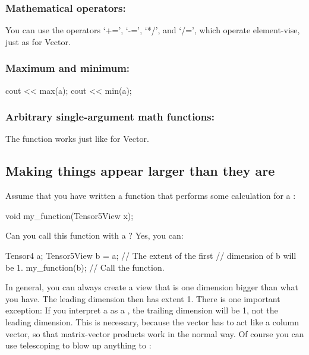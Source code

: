 \subsubsection{Mathematical operators:}

You can use the operators `+=', `-=', `*/', and `/=', which operate
element-vise, just as for Vector.

\subsubsection{Maximum and minimum:}
\begin{code}
cout << max(a);
cout << min(a);
\end{code}

\subsubsection{Arbitrary single-argument math functions:}

The function  works just like for Vector.

\subsection{Making things appear larger than they are}

Assume that you have written a function that performs some calculation
for a :
\begin{code}
void my_function(Tensor5View x);
\end{code}

\noindent Can you call this function with a ? Yes, you can:
\begin{code}
Tensor4 a;                      
Tensor5View b = a;              // The extent of the first
                                // dimension of b will be 1.
my_function(b);                 // Call the function.
\end{code}

In general, you can always create a view that is one dimension bigger
than what you have. The leading dimension then has extent 1. There is
one important exception: If you interpret a  as a
, the trailing dimension will be 1, not the leading
dimension. This is necessary, because the vector has to act like a
column vector, so that matrix-vector products work in the normal way.
Of course you can use telescoping to blow up anything to
: 

